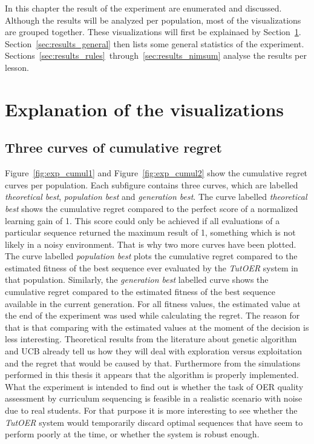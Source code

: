 In this chapter the result of the experiment are enumerated and discussed.
Although the results will be analyzed per population, most of the
visualizations are grouped together. These visualizations will first be
explainaed by Section~\ref{sec:results_explanation}.
Section~\ref{sec:results_general} then lists some general statistics of the
experiment.
Sections~\ref{sec:results_rules}~through~\ref{sec:results_nimsum}
analyse the results per lesson.

\section{Explanation of the visualizations}
\label{sec:results_explanation}
\subsection{Three curves of cumulative regret}
Figure~\ref{fig:exp_cumul1} and Figure~\ref{fig:exp_cumul2} show the cumulative
regret curves per population. Each subfigure contains three curves, which are
labelled \emph{theoretical best}, \emph{population best} and \emph{generation
best}. The curve labelled \emph{theoretical best} shows the cumulative regret
compared to the perfect score of a normalized learning gain of 1. This score
could only be achieved if all evaluations of a particular sequence returned the
maximum result of 1, something which is not likely in a noisy environment. That
is why two more curves have been plotted. The curve labelled \emph{population
best} plots the cumulative regret compared to the estimated fitness of the best
sequence ever evaluated by the \emph{TutOER} system in that population.
Similarly, the \emph{generation best} labelled curve shows the cumulative
regret compared to the estimated fitness of the best sequence available in the
current generation. For all fitness values, the estimated value at the end of
the experiment was used while calculating the regret. The reason for that is
that comparing with the estimated values at the moment of the decision is less
interesting. Theoretical results from the literature about genetic
algorithm and UCB already tell us how they will deal with exploration versus
exploitation and the regret that would be caused by that. Furthermore from the
simulations performed in this thesis it appears that the algorithm is properly
implemented. What the experiment is intended to find out is whether the task of
OER quality assessment by curriculum sequencing is feasible in a realistic
scenario with noise due to real students. For that purpose it is more
interesting to see whether the \emph{TutOER} system would temporarily discard
optimal sequences that have seem to perform poorly at the time, or whether the
system is robust enough.
